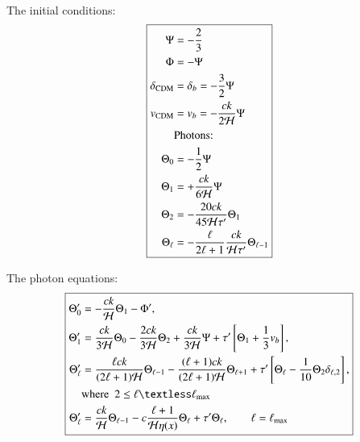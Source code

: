 \documentclass{aa}
\begin{document}
\\
The initial conditions:
$$
\boxed{
\begin{aligned}
\Psi &= -\frac{2}{3} \\
\Phi &= -\Psi \\
\delta_{\rm CDM} &= \delta_b = -\frac{3}{2} \Psi \\
v_{\rm CDM} &= v_b = -\frac{ck}{2\mathcal{H}} \Psi \\
&\text{Photons:}\\
\Theta_0 &= -\frac{1}{2} \Psi \\
\Theta_1 &= +\frac{ck}{6\mathcal{H}}\Psi \\
\Theta_2 &= -\frac{20ck}{45\mathcal{H}\tau^\prime} \Theta_1 \\
\Theta_\ell &= -\frac{\ell}{2\ell+1} \frac{ck}{\mathcal{H}\tau^\prime} \Theta_{\ell-1}\\
\end{aligned}
}
$$

The photon equations:
$$
\boxed{
\begin{aligned}
\Theta^\prime_0 &= -\frac{ck}{\mathcal{H}} \Theta_1 - \Phi^\prime, \\
\Theta^\prime_1 &=  \frac{ck}{3\mathcal{H}} \Theta_0 - \frac{2ck}{3\mathcal{H}}\Theta_2 +
\frac{ck}{3\mathcal{H}}\Psi + \tau^\prime\left[\Theta_1 + \frac{1}{3}v_b\right], \\
\Theta^\prime_\ell &= \frac{\ell ck}{(2\ell+1)\mathcal{H}}\Theta_{\ell-1} - \frac{(\ell+1)ck}{(2\ell+1)\mathcal{H}}
\Theta_{\ell+1} + \tau^\prime\left[\Theta_\ell - \frac{1}{10}\Theta_2
\delta_{\ell,2}\right],\\ 
& \mathrm{where} \ \ 2 \leq \ell \textless \ell_{\textrm{max}} \\
\Theta_{\ell}^\prime &= \frac{ck}{\mathcal{H}}
\Theta_{\ell-1}-c\frac{\ell+1}{\mathcal{H}\eta(x)}\Theta_\ell+\tau^\prime\Theta_\ell,
\quad\quad \ell = \ell_{\textrm{max}}\\
\end{aligned}
}
$$
\end{document}
